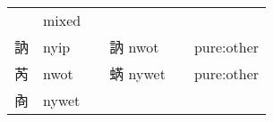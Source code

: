 \documentclass[14pt,a4paper]{scrartcl}
\begin{document}
\begin{longtable}[c]{@{}llllll@{}}
\begin{minipage}[t]{0.14\columnwidth}\raggedright\strut
\strut\end{minipage} &
\begin{minipage}[t]{0.14\columnwidth}\raggedright\strut
mixed
\strut\end{minipage}\tabularnewline
\begin{minipage}[t]{0.14\columnwidth}\raggedright\strut
訥
\strut\end{minipage} &
\begin{minipage}[t]{0.14\columnwidth}\raggedright\strut
nyip
\strut\end{minipage} &
\begin{minipage}[t]{0.14\columnwidth}\raggedright\strut
\strut\end{minipage} &
\begin{minipage}[t]{0.14\columnwidth}\raggedright\strut
訥 nwot
\strut\end{minipage} &
\begin{minipage}[t]{0.14\columnwidth}\raggedright\strut
\strut\end{minipage} &
\begin{minipage}[t]{0.14\columnwidth}\raggedright\strut
pure:other
\strut\end{minipage}\tabularnewline
\begin{minipage}[t]{0.14\columnwidth}\raggedright\strut
芮
\strut\end{minipage} &
\begin{minipage}[t]{0.14\columnwidth}\raggedright\strut
nwot
\strut\end{minipage} &
\begin{minipage}[t]{0.14\columnwidth}\raggedright\strut
\strut\end{minipage} &
\begin{minipage}[t]{0.14\columnwidth}\raggedright\strut
蜹 nywet
\strut\end{minipage} &
\begin{minipage}[t]{0.14\columnwidth}\raggedright\strut
\strut\end{minipage} &
\begin{minipage}[t]{0.14\columnwidth}\raggedright\strut
pure:other
\strut\end{minipage}\tabularnewline
\begin{minipage}[t]{0.14\columnwidth}\raggedright\strut
㕯
\strut\end{minipage} &
\begin{minipage}[t]{0.14\columnwidth}\raggedright\strut
nywet
\strut\end{minipage} &

\end{longtable}
\end{document}
